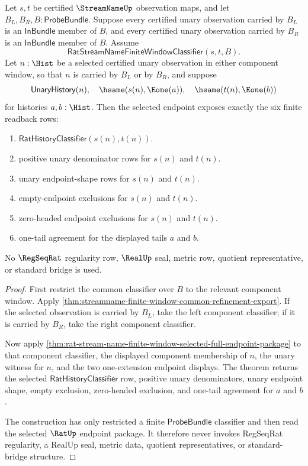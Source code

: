 \begin{theorem}
\label{thm:streamname-window-common-refinement-readback}
Let $s,t$ be certified $\StreamNameUp$ observation maps, and let
$B_L,B_R,B:\mathsf{ProbeBundle}$. Suppose every certified unary observation
carried by $B_L$ is an $\mathsf{InBundle}$ member of $B$, and every certified
unary observation carried by $B_R$ is an $\mathsf{InBundle}$ member of $B$.
Assume
$$
\mathsf{RatStreamNameFiniteWindowClassifier}(s,t,B).
$$
Let $n:\Hist$ be a selected certified unary observation in either component
window, so that $n$ is carried by $B_L$ or by $B_R$, and suppose
$$
\mathsf{UnaryHistory}(n),
\quad
\hsame(s(n),\Eone(a)),
\quad
\hsame(t(n),\Eone(b))
$$
for histories $a,b:\Hist$. Then the selected endpoint exposes exactly the six
finite readback rows:
\begin{enumerate}
  \item $\mathsf{RatHistoryClassifier}(s(n),t(n))$.
  \item positive unary denominator rows for $s(n)$ and $t(n)$.
  \item unary endpoint-shape rows for $s(n)$ and $t(n)$.
  \item empty-endpoint exclusions for $s(n)$ and $t(n)$.
  \item zero-headed endpoint exclusions for $s(n)$ and $t(n)$.
  \item one-tail agreement for the displayed tails $a$ and $b$.
\end{enumerate}
No $\RegSeqRat$ regularity row, $\RealUp$ seal, metric row, quotient
representative, or standard bridge is used.
\end{theorem}

\begin{proof}
First restrict the common classifier over $B$ to the relevant component window.
Apply \autoref{thm:streamname-finite-window-common-refinement-export}. If the
selected observation is carried by $B_L$, take the left component classifier; if
it is carried by $B_R$, take the right component classifier.

Now apply
\autoref{thm:rat-stream-name-finite-window-selected-full-endpoint-package} to
that component classifier, the displayed component membership of $n$, the unary
witness for $n$, and the two one-extension endpoint displays. The theorem
returns the selected $\mathsf{RatHistoryClassifier}$ row, positive unary
denominators, unary endpoint shape, empty exclusion, zero-headed exclusion, and
one-tail agreement for $a$ and $b$.

The construction has only restricted a finite $\mathsf{ProbeBundle}$ classifier
and then read the selected $\RatUp$ endpoint package. It therefore never invokes
RegSeqRat regularity, a RealUp seal, metric data, quotient representatives, or
standard-bridge structure.
\end{proof}

